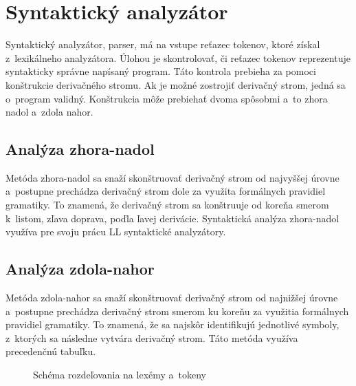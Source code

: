 \section{Syntaktický analyzátor}
Syntaktický analyzátor, parser, má na vstupe reťazec tokenov, ktoré získal
z~lexikálneho analyzátora. Úlohou je skontrolovať, či
reťazec tokenov reprezentuje syntakticky správne napísaný program. Táto kontrola
prebieha za pomoci konštrukcie derivačného stromu. Ak je možné zostrojiť derivačný strom,
jedná sa o~program validný. Konštrukcia môže prebiehať dvoma spôsobmi a~to zhora
nadol a~zdola nahor. \cite{meduna}

\subsection{Analýza zhora-nadol}
Metóda zhora-nadol sa snaží skonštruovať derivačný strom od najvyššej úrovne a~postupne prechádza
derivačný strom dole za využita formálnych pravidiel gramatiky. To znamená, že derivačný strom sa
konštruuje od koreňa smerom k~listom, zľava doprava, poďla ľavej derivácie. Syntaktická analýza
zhora-nadol využíva pre svoju prácu LL syntaktické analyzátory. \cite{aho}

\subsection{Analýza zdola-nahor}
Metóda zdola-nahor sa snaží skonštruovať derivačný strom od najnižšej úrovne a~postupne prechádza
derivačný strom smerom ku koreňu za využitia formálnych pravidiel gramatiky. To znamená, že sa
najskôr identifikujú jednotlivé symboly, z~ktorých sa následne vytvára derivačný strom. Táto metóda
využíva precedenčnú tabuľku. \cite{aho}

\begin{center}
\begin{figure}
\caption{Schéma rozdeľovania na lexémy a~tokeny}
\label{fig:lex}
\end{figure}
\end{center}

